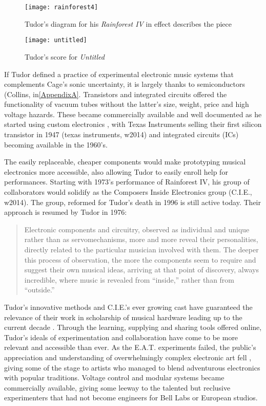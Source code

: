\begin{itemize}
	\begin{figure}[h!]
	  \caption{Tudor's diagram for his \emph{Rainforest IV} in effect describes the piece}
	  \centering
	    \texttt{[image: rainforest4]}
	\end{figure}

	\begin{figure}[h!]
	  \caption{Tudor's score for \emph{Untitled}}
	  \centering
	    \texttt{[image: untitled]}
	\end{figure}

If Tudor defined a practice of experimental electronic music systems that complements Cage’s sonic uncertainty, it is largely thanks to semiconductors (Collins, in\ref{AppendixA}. Transistors and integrated circuits offered the functionality of vacuum tubes without the latter’s size, weight, price and high voltage hazards. These became commercially available and well documented as he started using custom electronics \citep{collins2004}, with Texas Instruments selling their first silicon transistor in 1947 (texas instruments, w2014) and integrated circuits (ICs) becoming available in the 1960’s.  

The easily replaceable, cheaper components would make prototyping musical electronics more accessible, also allowing Tudor to easily enroll help for performances. Starting with 1973’s performance of Rainforest IV, his group of collaborators would solidify as the Composers Inside Electronics group (C.I.E., w2014). The group, reformed for Tudor’s death in 1996 is still active today. Their approach is resumed by Tudor in 1976: 

\begin{quote}
						
Electronic components and circuitry, observed as individual and unique rather than as servomechanisms, more and more reveal their personalities, directly related to the particular musician involved with them. The deeper this process of observation, the more the components seem to require and suggest their own musical ideas, arriving at that point of discovery, always incredible, where music is revealed from ``inside,'' rather than from ``outside.'' \citep{tudor1976,nakai2014}

\end{quote}

Tudor’s innovative methods and C.I.E.’s ever growing cast have guaranteed the relevance of their work in scholarship of musical hardware leading up to the current decade \citep{collins2004,collins2006,collins2008,collins2010,nakai2014,driscoll2004,kuivila2004}. Through the learning, supplying and sharing tools offered online, Tudor’s ideals of experimentation and collaboration have come to be more relevant and accessible than ever. As the E.A.T. experiments failed, the public's appreciation and understanding of overwhelmingly complex electronic art fell \citep{burnham1979}, giving some of the stage to artists who managed to blend adventurous electronics with popular traditions. Voltage control and modular systems became commercially available, giving some leeway to the talented but reclusive experimenters that had not become engineers for Bell Labs or European studios. 


\end{itemize}
